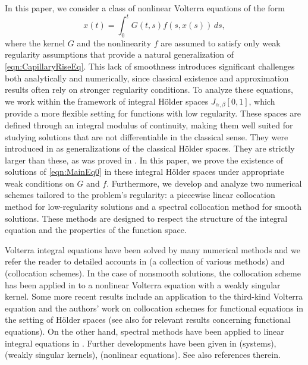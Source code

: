 \documentclass[12pt,a4paper]{article}
\begin{document}
In this paper, we consider a class of nonlinear Volterra equations of the form
\begin{equation}\label{eqn:MainEq0}
	x(t) = \int_0^t G(t,s) f(s, x(s)) \, ds,
\end{equation}
where the kernel $G$ and the nonlinearity $f$ are assumed to satisfy only weak regularity assumptions that provide a natural generalization of \eqref{eqn:CapillaryRiseEq}. This lack of smoothness introduces significant challenges both analytically and numerically, since classical existence and approximation results often rely on stronger regularity conditions. To analyze these equations, we work within the framework of integral H\"older spaces $J_{\alpha,\beta}[0,1]$, which provide a more flexible setting for functions with low regularity. These spaces are defined through an integral modulus of continuity, making them well suited for studying solutions that are not differentiable in the classical sense. They were introduced in \cite{appell2021holder,appell1987application} as generalizations of the classical H\"older spaces. They are strictly larger than these, as was proved in \cite{appell1987application, cichon2022banach}. In this paper, we prove the existence of solutions of \eqref{eqn:MainEq0} in these integral H\"older spaces under appropriate weak conditions on $G$ and $f$. Furthermore, we develop and analyze two numerical schemes tailored to the problem's regularity: a piecewise linear collocation method for low-regularity solutions and a spectral collocation method for smooth solutions. These methods are designed to respect the structure of the integral equation and the properties of the function space.

Volterra integral equations have been solved by many numerical methods and we refer the reader to detailed accounts in \cite{atkinson1997numerical} (a collection of various methods) and \cite{brunner2004collocation} (collocation schemes). In the case of nonsmooth solutions, the collocation scheme has been applied in \cite{riele1982collocation} to a nonlinear Volterra equation with a weakly singular kernel. Some more recent results include an application to the third-kind Volterra equation \cite{ma2023fractional} and the authors' work on collocation schemes for functional equations in the setting of H\"older spaces \cite{ okrasinska2020solvability,caballero2025collocation} (see also \cite{brunner2011analysis} for relevant results concerning functional equations). On the other hand, spectral methods have been applied to linear integral equations in \cite{tang2008spectral}. Further developments have been given in \cite{samadi2012spectral} (systems), \cite{chen2010convergence} (weakly singular kernels), \cite{sheng2014multistep, zakeri2010sinc} (nonlinear equations). See also references therein.  
\end{document}
